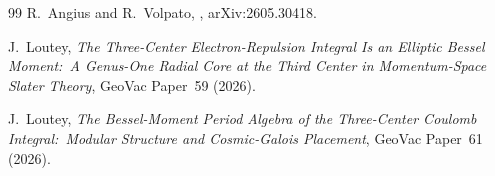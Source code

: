\documentclass[11pt,a4paper]{article}
\theoremstyle{plain}
\theoremstyle{definition}
\begin{document}
\begin{thebibliography}{99}
R.~Angius and R.~Volpato,
,
\newblock arXiv:2605.30418.

J.~Loutey, \emph{The Three-Center Electron-Repulsion Integral Is an Elliptic
Bessel Moment:\ A Genus-One Radial Core at the Third Center in Momentum-Space Slater Theory},
GeoVac Paper~59 (2026).

J.~Loutey, \emph{The Bessel-Moment Period Algebra of the Three-Center Coulomb
Integral:\ Modular Structure and Cosmic-Galois Placement}, GeoVac Paper~61 (2026).

\end{thebibliography}
\end{document}

